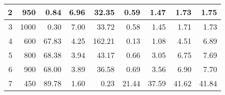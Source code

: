 \documentclass[runningheads,a4paper]{llncs}
\begin{document}
\begin{table}[!t]
\begin{tabular}{|r|r|r|r|r|r|r|r|r|}
2                                         & 950                                        & 0.84                                                                                              & 6.96                                          &                                       32.35                                                               & 0.59                        &        1.47                    &         1.73 & 1.75                          \\ \hline
3                                         & 1000                                       & 0.30                                                                                              & 7.00                                          &     33.72                                                                                                 & 0.58                       & 1.45                         & 1.71                         & 1.73                           \\ \hline
4                                         & 600                                        & 67.83                                                                                             & 4.25                                          &                           162.21                                                                           & 0.13                        & 1.08                         & 4.51                          & 6.89                          \\ \hline
5                                         & 800                                        & 68.38                                                                                             & 3.94                                          &                                                                   43.17                                   & 0.66                        & 3.05                         &         6.75                      & 7.69                          \\ \hline
6                                         & 900                                        & 68.00                                                                                             & 3.89                                          &                                           36.58                                                           & 0.69                        & 3.56                         & 6.90                          & 7.70                          \\ \hline
7                                         & 450                                        & 89.78                                                                                             & 1.60                                          &                       0.23                                                                               & 21.44                       & 37.59                        & 41.62                         & 41.84                         \\ \hline

\end{tabular}
\end{table}
\end{document}
